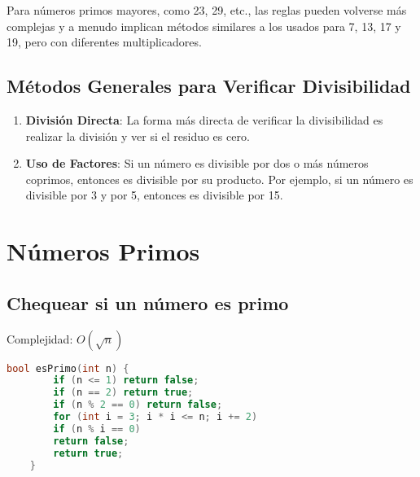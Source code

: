 Para números primos mayores, como 23, 29, etc., las reglas pueden volverse más complejas y a menudo implican métodos similares a los usados para 7, 13, 17 y 19, pero con diferentes multiplicadores.

\subsection{Métodos Generales para Verificar Divisibilidad}

\begin{enumerate}
	\item \textbf{División Directa}: La forma más directa de verificar la divisibilidad es realizar la división y ver si el residuo es cero.
	\item \textbf{Uso de Factores}: Si un número es divisible por dos o más números coprimos, entonces es divisible por su producto. Por ejemplo, si un número es divisible por 3 y por 5, entonces es divisible por 15.
\end{enumerate}


\section{Números Primos}

\subsection{Chequear si un número es primo}

Complejidad: \( O(\sqrt{n}) \)
\begin{lstlisting}[language=C++, caption={Chequear si un número es primo}]
	bool esPrimo(int n) {
		if (n <= 1) return false;
		if (n == 2) return true;
		if (n % 2 == 0) return false;
		for (int i = 3; i * i <= n; i += 2)
		if (n % i == 0)
		return false;
		return true;
	}
\end{lstlisting}

